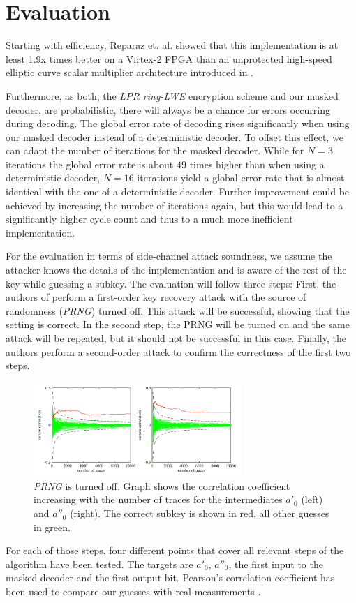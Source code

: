 \section{Evaluation}
Starting with efficiency, Reparaz et. al. showed that this implementation is at least 1.9x times better on a Virtex-2 FPGA than an unprotected high-speed elliptic curve scalar multiplier architecture introduced in \cite{Rebeiro2012}.

Furthermore, as both, the \textit{\ac{LPR} \ac{ring-LWE}} encryption scheme and our masked decoder, are probabilistic, there will always be a chance for errors occurring during decoding. The global error rate of decoding rises significantly when using our masked decoder instead of a deterministic decoder. To offset this effect, we can adapt the number of iterations for the masked decoder. While for \(N=3\) iterations the global error rate is about \(49\) times higher than when using a deterministic decoder, \(N=16\) iterations yield a global error rate that is almost identical with the one of a deterministic decoder. Further improvement could be achieved by increasing the number of iterations again, but this would lead to a significantly higher cycle count and thus to a much more inefficient implementation.

For the evaluation in terms of side-channel attack soundness, we assume the attacker knows the details of the implementation and is aware of the rest of the key while guessing a subkey. The evaluation will follow three steps: First, the authors of \cite{maskedRing} perform a first-order key recovery attack with the source of randomness (\textit{\acs{PRNG}}) turned off. This attack will be successful, showing that the setting is correct. In the second step, the PRNG will be turned on and the same attack will be repeated, but it should not be successful in this case. Finally, the authors perform a second-order attack to confirm the correctness of the first two steps.
\begin{figure}[H]
	\centering
	\includegraphics[width=0.7\textwidth]{dpa_1.png}
	\caption{\textit{\acs{PRNG}} is turned off. Graph shows the correlation coefficient increasing with the number of traces for the intermediates \(a'_0\) (left) and \(a''_0\) (right). The correct subkey is shown in red, all other guesses in green. \cite{maskedRing}}
	\label{dpa_1}
\end{figure}
For each of those steps, four different points that cover all relevant steps of the algorithm have been tested. The targets are \(a'_0\), \(a''_0\), the first input to the masked decoder and the first output bit. Pearson's correlation coefficient has been used to compare our guesses with real measurements \cite{Brier2004}.

